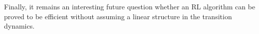 Finally, it remains an interesting future question whether an RL algorithm can be proved to be efficient without assuming a linear structure in the transition dynamics.












